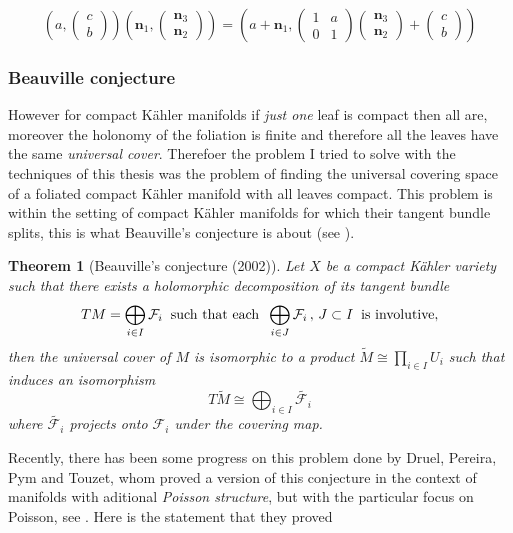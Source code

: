 \documentclass[12pt,twoside,a4paper]{report}
\newtheorem{theorem}{Theorem}[section]
\begin{document}
 \begin{equation}\left(a,\begin{pmatrix}c\\b\end{pmatrix}\right)
 \left(\mathbf{n}_1,\begin{pmatrix}\mathbf{n}_3\\\mathbf{n}_2\end{pmatrix}\right)=
 \left(a+\mathbf{n}_1,\begin{pmatrix}1&a\\0&1\end{pmatrix}\begin{pmatrix}\mathbf{n}_3\\\mathbf{n}_2\end{pmatrix}+\begin{pmatrix}c\\b\end{pmatrix}\right)
\end{equation} 







\subsubsection*{Beauville conjecture}
However for compact Kähler manifolds if \emph{just one} leaf is compact then all are, moreover the holonomy of the foliation is finite and therefore all the leaves have the same \emph{universal cover}. Therefoer the problem I tried to solve with the techniques of this thesis was the problem of finding the universal covering space of a foliated compact Kähler manifold with all leaves compact. This problem is within the setting of compact Kähler manifolds for which their tangent bundle splits, this is what Beauville's conjecture is about (see \cite{Beauville}).
\begin{theorem}[Beauville's conjecture (2002)]\label{Beauville}
        Let $X$ be a compact Kähler variety such that there exists a holomorphic decomposition of its tangent bundle
        \[
        TM=\bigoplus_{i\in I}\mathcal{F}_i\hspace{0.2cm}\text{such that each}\hspace{0.2cm}\bigoplus_{i\in J}\mathcal{F}_i\,,\,J\subset I\hspace{0.2cm}\text{is involutive},
        \]
        then the universal cover of $M$ is isomorphic to a product $\widetilde{M}\cong\prod_{i\in I}U_i$ such that induces an isomorphism
        \[
          T\widetilde{M}\cong\bigoplus_{i\in I}\widetilde{\mathcal{F}_i}
        \]
      where $\widetilde{\mathcal{F}_{i}}$ projects onto $\mathcal{F}_{i}$ under the covering map.
\end{theorem}
Recently, there has been some progress on this problem done by Druel, Pereira, Pym and Touzet, whom proved a version of this conjecture in the context of manifolds with aditional \emph{Poisson structure}, but with the particular focus on Poisson, see \cite{DPPT}. Here is the statement that they proved
\end{document}
